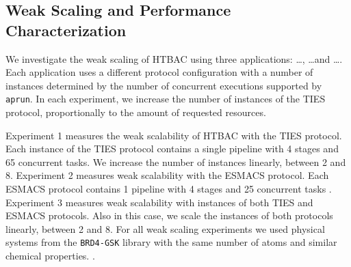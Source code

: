 \subsection{Weak Scaling and Performance Characterization}


We investigate the weak scaling of HTBAC using three
applications: \ldots, \ldots and \ldots. Each application
uses a different protocol configuration with a number of instances determined
by the number of concurrent executions supported by \texttt{aprun}. In each
experiment, we increase the number of instances of the TIES protocol,
proportionally to the amount of requested resources. 

Experiment 1 measures the weak scalability of HTBAC with the TIES protocol.
Each instance of the TIES protocol contains a single pipeline with 4 stages
and 65 concurrent tasks. We increase the number of instances linearly,
between 2 and 8. Experiment 2 measures weak scalability with the ESMACS
protocol. Each ESMACS protocol contains 1 pipeline with 4 stages and 25
concurrent tasks . Experiment 3 measures weak scalability
with instances of both TIES and ESMACS protocols. Also in this case, we scale
the instances of both protocols linearly, between 2 and 8. For all weak
scaling experiments we used  physical systems
from the \texttt{BRD4-GSK} library with the same number of atoms and similar
chemical properties. .


